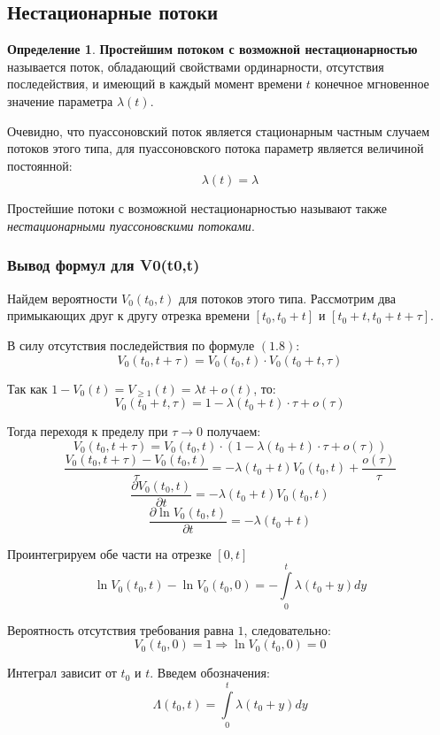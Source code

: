 \documentclass[aps,%
12pt,%
final,%
oneside,
onecolumn,%
musixtex, %
superscriptaddress,%
centertags]{article} %
\theoremstyle{plain}
\theoremstyle{definition}
\newtheorem{definition}{Определение}[subsection]
\theoremstyle{remark}
\begin{document}
\newpage

\subsection{Нестационарные потоки}

\begin{definition}
	\textbf{Простейшим потоком с возможной нестационарностью} называется поток, обладающий свойствами ординарности, отсутствия последействия, и имеющий в каждый момент времени $t$ конечное мгновенное значение параметра $\lambda(t)$.
\end{definition}

Очевидно, что пуассоновский поток является стационарным частным случаем потоков этого типа, для пуассоновского потока параметр является величиной постоянной:
$$\lambda(t) = \lambda$$

Простейшие потоки с возможной нестационарностью называют также \textit{нестационарными пуассоновскими потоками}.

\subsubsection{Вывод формул для V0(t0,t)}

Найдем вероятности $V_0(t_0,t)$ для потоков этого типа. Рассмотрим два примыкающих друг к другу отрезка времени $[t_0,t_0 + t]$ и $[t_0+t,t_0+t+\tau]$.

В силу отсутствия последействия по формуле $(1.8)$:
$$V_0(t_0,t+\tau) = V_0(t_0,t) \cdot V_0(t_0+t,\tau)$$

Так как $1-V_0(t) = V_{\geq 1}(t) = \lambda t + o(t)$, то:
$$V_0(t_0+t,\tau) = 1 - \lambda(t_0+t) \cdot \tau + o(\tau)$$

Тогда переходя к пределу при $\tau \to 0$ получаем:
$$V_0(t_0,t+\tau) = V_0(t_0,t) \cdot (1 - \lambda(t_0+t) \cdot \tau + o(\tau))$$
$$\frac{V_0(t_0,t+\tau)- V_0(t_0,t)}{\tau} = - \lambda(t_0+t)V_0(t_0,t) + \frac{o(\tau)}{\tau}$$
$$\frac{\partial V_0(t_0,t)}{\partial t} = -\lambda (t_0+t)V_0(t_0,t)$$
$$\frac{\partial \ln V_0(t_0,t)}{\partial t} = -\lambda (t_0+t)$$

Проинтегрируем обе части на отрезке $[0,t]$
$$\ln V_0(t_0,t) - \ln V_0(t_0,0) = -\int\limits_0^t \lambda(t_0+y)dy$$

Вероятность отсутствия требования равна $1$, следовательно:
$$V_0(t_0,0) = 1 \Rightarrow \ln V_0(t_0,0) = 0$$

Интеграл зависит от $t_0$ и $t$. Введем обозначения:
$$\Lambda (t_0,t) = \int\limits_0^t \lambda(t_0+y)dy$$
\end{document}
